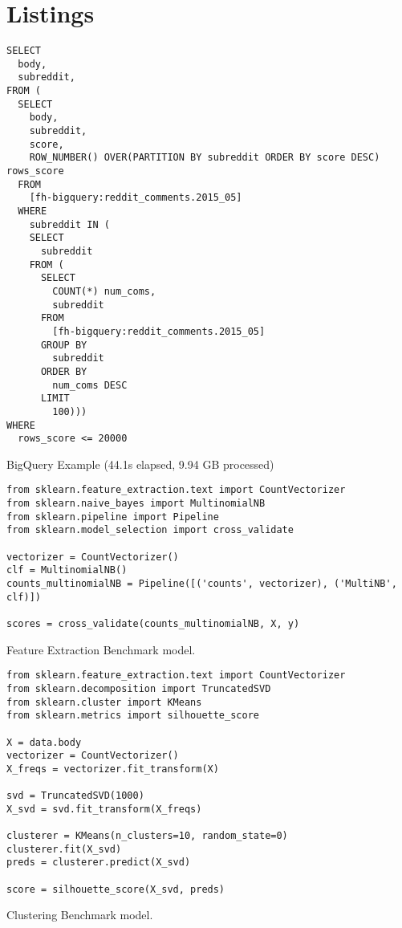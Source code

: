 \documentclass[]{article}
\begin{document}
\clearpage
\section*{Listings}
\begin{listing}[H]
\begin{verbatim}
SELECT
  body,
  subreddit,
FROM (
  SELECT
    body,
    subreddit,
    score,
    ROW_NUMBER() OVER(PARTITION BY subreddit ORDER BY score DESC) rows_score
  FROM
    [fh-bigquery:reddit_comments.2015_05]
  WHERE
    subreddit IN (
    SELECT
      subreddit
    FROM (
      SELECT
        COUNT(*) num_coms,
        subreddit
      FROM
        [fh-bigquery:reddit_comments.2015_05]
      GROUP BY
        subreddit
      ORDER BY
        num_coms DESC
      LIMIT
        100)))
WHERE
  rows_score <= 20000
\end{verbatim}  
\caption{BigQuery Example (44.1s elapsed, 9.94 GB processed)}
\label{listing:bigquery}
\end{listing}
\begin{listing}[H]
\begin{verbatim}
from sklearn.feature_extraction.text import CountVectorizer
from sklearn.naive_bayes import MultinomialNB
from sklearn.pipeline import Pipeline
from sklearn.model_selection import cross_validate

vectorizer = CountVectorizer()
clf = MultinomialNB()
counts_multinomialNB = Pipeline([('counts', vectorizer), ('MultiNB', clf)])

scores = cross_validate(counts_multinomialNB, X, y)
\end{verbatim}
\caption{Feature Extraction Benchmark model.}
\label{listing:featurebenchmark}
\end{listing}
\begin{listing}[H]
\begin{verbatim}
from sklearn.feature_extraction.text import CountVectorizer
from sklearn.decomposition import TruncatedSVD
from sklearn.cluster import KMeans
from sklearn.metrics import silhouette_score

X = data.body
vectorizer = CountVectorizer()
X_freqs = vectorizer.fit_transform(X)

svd = TruncatedSVD(1000)
X_svd = svd.fit_transform(X_freqs)

clusterer = KMeans(n_clusters=10, random_state=0)
clusterer.fit(X_svd)
preds = clusterer.predict(X_svd)

score = silhouette_score(X_svd, preds)
\end{verbatim}
\caption{Clustering Benchmark model.}
\label{listing:clusterbenchmark}
\end{listing}

\printbibliography
\end{document}
